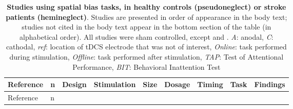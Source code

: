 \documentclass[11pt,english,]{memoir}
\begin{document}
\begin{longtable}[]{@{}lllllllll@{}}
\caption{\label{tab:spatial-bias} \textbf{Studies using spatial bias tasks, in healthy controls (pseudoneglect) or stroke patients (hemineglect)}. Studies are presented in order of appearance in the body text; studies not cited in the body text appear in the bottom section of the table (in alphabetical order). All studies were sham controlled, except \textcite{Turgut2016} and \textcite{Bang2015}. \emph{A}: anodal, \emph{C}: cathodal, \emph{ref}: location of tDCS electrode that was not of interest, \emph{Online}: task performed during stimulation, \emph{Offline}: task performed after stimulation, \emph{TAP}: Test of Attentional Performance, \emph{BIT}: Behavioral Inattention Test}\tabularnewline
\toprule
\begin{minipage}[b]{0.09\columnwidth}\raggedright
Reference\strut
\end{minipage} & \begin{minipage}[b]{0.02\columnwidth}\raggedright
n\strut
\end{minipage} & \begin{minipage}[b]{0.04\columnwidth}\raggedright
Design\strut
\end{minipage} & \begin{minipage}[b]{0.10\columnwidth}\raggedright
Stimulation\strut
\end{minipage} & \begin{minipage}[b]{0.04\columnwidth}\raggedright
Size\strut
\end{minipage} & \begin{minipage}[b]{0.04\columnwidth}\raggedright
Dosage\strut
\end{minipage} & \begin{minipage}[b]{0.04\columnwidth}\raggedright
Timing\strut
\end{minipage} & \begin{minipage}[b]{0.10\columnwidth}\raggedright
Task\strut
\end{minipage} & \begin{minipage}[b]{0.28\columnwidth}\raggedright
Findings\strut
\end{minipage}\tabularnewline
\midrule
\endfirsthead
\toprule
\begin{minipage}[b]{0.09\columnwidth}\raggedright
Reference\strut
\end{minipage} & \begin{minipage}[b]{0.02\columnwidth}\raggedright
n\strut
\end{minipage} & \begin{minipage}[b]{0.04\columnwidth}\raggedright

\end{minipage}
\end{longtable}
\end{document}
